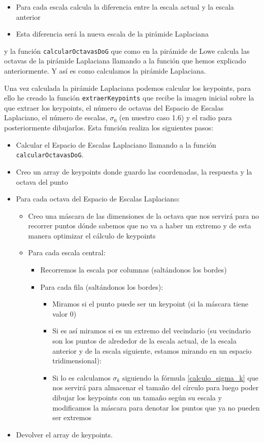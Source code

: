 \documentclass[12pt,spanish]{article}
\begin{document}
\begin{itemize}
	\item Para cada escala calcula la diferencia entre la escala actual y la escala anterior
	\item Esta diferencia será la nueva escala de la pirámide Laplaciana
\end{itemize}

y la función \texttt{calcularOctavasDoG} que como en la pirámide de Lowe calcula las octavas de la pirámide Laplaciana llamando a la función que hemos explicado anteriormente. Y así es como calculamos la pirámide Laplaciana.

Una vez calculada la pirámide Laplaciana podemos calcular los keypoints, para ello he creado la función \texttt{extraerKeypoints} que recibe la imagen inicial sobre la que extraer los keypoints, el número de octavas del Espacio de Escalas Laplaciano, el número de escalas, $\sigma_0$ (en nuestro caso 1.6) y el radio para posteriormente dibujarlos. Esta función realiza los siguientes pasos:

\begin{itemize}
	\item Calcular el Espacio de Escalas Laplaciano llamando a la función \texttt{calcularOctavasDoG}.
	\item Creo un array de keypoints donde guardo las coordenadas, la respuesta y la octava del punto
	\item Para cada octava del Espacio de Escalas Laplaciano:
		\begin{itemize}
			\item Creo una máscara de las dimensiones de la octava que nos servirá para no recorrer puntos dónde sabemos que no va a haber un extremo y de esta manera optimizar el cálculo de keypoints
			\item Para cada escala central:
				\begin{itemize}
					\item Recorremos la escala por columnas (saltándonos los bordes)
					\item Para cada fila (saltándonos los bordes):
						\begin{itemize}
							\item Miramos si el punto puede ser un keypoint (si la máscara tiene valor 0)
							\item Si es así miramos si es un extremo del vecindario (su vecindario son los puntos de alrededor de la escala actual, de la escala anterior y de la escala siguiente, estamos mirando en un espacio tridimensional):
							\item Si lo es calculamos $\sigma_k$ siguiendo la fórmula \ref{calculo_sigma_k} que nos servirá para almacenar el tamaño del círculo para luego poder dibujar los keypoints con un tamaño según su escala y modificamos la máscara para denotar los puntos que ya no pueden ser extremos			
						\end{itemize}							
				\end{itemize}
		\end{itemize}
	\item Devolver el array de keypoints.
\end{itemize}
\end{document}
